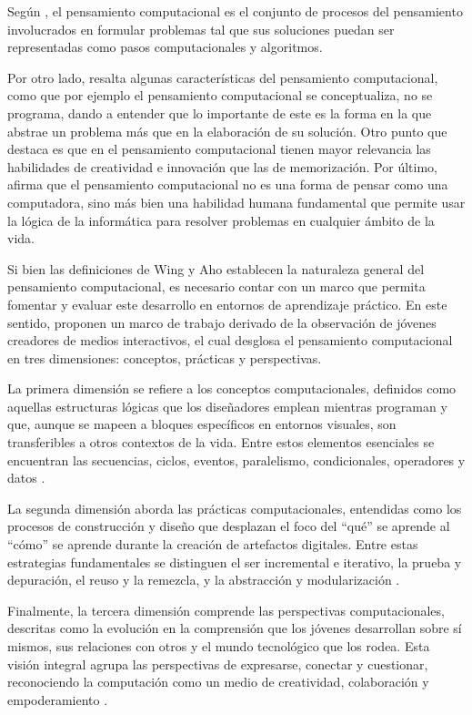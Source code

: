 

Según , el pensamiento computacional es el conjunto de procesos del pensamiento involucrados en formular problemas tal que sus soluciones puedan ser representadas como pasos computacionales y algoritmos.

Por otro lado,  resalta algunas características del pensamiento computacional, como que por ejemplo el pensamiento computacional se conceptualiza, no se programa, dando a entender que lo importante de este es la forma en la que abstrae un problema más que en la elaboración de su solución. Otro punto que destaca es que en el pensamiento computacional tienen mayor relevancia las habilidades de creatividad e innovación que las de memorización. Por último, afirma que el pensamiento computacional no es una forma de pensar como una computadora, sino más bien una habilidad humana fundamental que permite usar la lógica de la informática para resolver problemas en cualquier ámbito de la vida.

Si bien las definiciones de Wing y Aho establecen la naturaleza general del pensamiento computacional, es necesario contar con un marco que permita fomentar y evaluar este desarrollo en entornos de aprendizaje práctico. En este sentido,  proponen un marco de trabajo derivado de la observación de jóvenes creadores de medios interactivos, el cual desglosa el pensamiento computacional en tres dimensiones: conceptos, prácticas y perspectivas.

La primera dimensión se refiere a los conceptos computacionales, definidos como aquellas estructuras lógicas que los diseñadores emplean mientras programan y que, aunque se mapeen a bloques específicos en entornos visuales, son transferibles a otros contextos de la vida. Entre estos elementos esenciales se encuentran las secuencias, ciclos, eventos, paralelismo, condicionales, operadores y datos \cite[p.~3-6]{brennan2012}.

La segunda dimensión aborda las prácticas computacionales, entendidas como los procesos de construcción y diseño que desplazan el foco del “qué” se aprende al “cómo” se aprende durante la creación de artefactos digitales. Entre estas estrategias fundamentales se distinguen el ser incremental e iterativo, la prueba y depuración, el reuso y la remezcla, y la abstracción y modularización \cite[p.~6-9]{brennan2012}.

Finalmente, la tercera dimensión comprende las perspectivas computacionales, descritas como la evolución en la comprensión que los jóvenes desarrollan sobre sí mismos, sus relaciones con otros y el mundo tecnológico que los rodea. Esta visión integral agrupa las perspectivas de expresarse, conectar y cuestionar, reconociendo la computación como un medio de creatividad, colaboración y empoderamiento \cite[p.~10-11]{brennan2012}.


